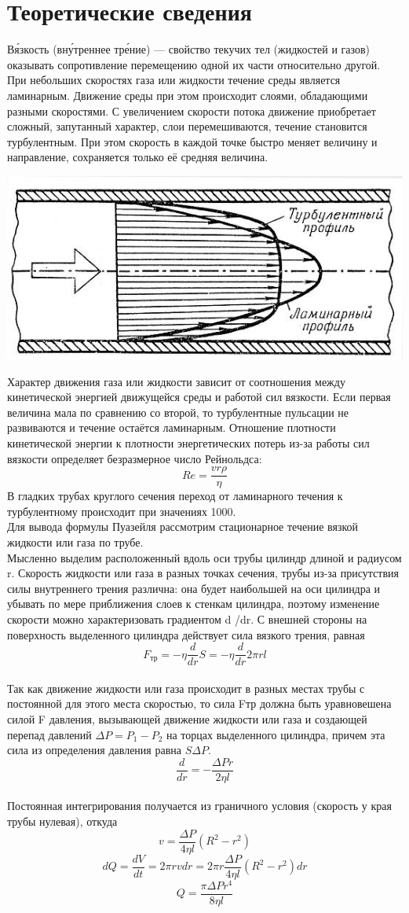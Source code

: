 \section{Теоретические сведения}
Вя́зкость (вну́треннее тре́ние) — свойство текучих тел (жидкостей и газов) оказывать сопротивление перемещению одной их части относительно другой. \\
При небольших скоростях газа или жидкости течение среды является ламинарным. Движение среды при этом происходит слоями, обладающими разными скоростями. С увеличением скорости потока движение приобретает сложный, запутанный характер, слои перемешиваются, течение становится турбулентным. При этом скорость в каждой точке быстро меняет величину и направление, сохраняется только её средняя величина.\\
\begin{center}
\includegraphics[width=0.3\linewidth]{1.jpg}\\
\end{center}
Характер движения газа или жидкости зависит от соотношения между кинетической энергией движущейся среды и работой сил вязкости. Если первая величина мала по сравнению со второй, то турбулентные пульсации не развиваются и течение остаётся ламинарным. Отношение плотности кинетической энергии к плотности энергетических потерь из-за работы сил вязкости определяет безразмерное число Рейнольдса:
\[ Re = \frac{vr\rho}{\eta} \]
В гладких трубах круглого сечения переход от ламинарного течения к турбулентному происходит при значениях 1000.\\
Для вывода формулы Пуазейля рассмотрим стационарное течение вязкой жидкости или газа по трубе.\\
Мысленно выделим расположенный вдоль оси трубы цилиндр длиной  и радиусом r. Скорость жидкости или газа в разных точках сечения, трубы из-за присутствия силы внутреннего трения различна: она будет наибольшей на оси цилиндра и убывать по мере приближения слоев к стенкам цилиндра, поэтому изменение скорости можно характеризовать градиентом d /dr. С внешней стороны на поверхность выделенного цилиндра действует сила вязкого трения, равная \[ F_{тр} = -\eta\frac{d}{dr}S = -\eta\frac{d}{dr}2\pi rl \]\\
Так как движение жидкости или газа происходит в разных местах трубы с постоянной для этого места скоростью, то сила Fтр должна быть уравновешена силой F давления, вызывающей движение жидкости или газа и создающей перепад давлений $\Delta P = P_1 - P_2$ на торцах выделенного цилиндра, причем эта сила из определения давления равна $S\Delta P$. \\
\[\frac{d}{dr} =  -\frac{\Delta Pr}{2\eta l}\]\\
Постоянная интегрирования получается из граничного условия (скорость у края трубы нулевая), откуда\\
\[v =  \frac{\Delta P}{4\eta l}(R^2-r^2) \]
\[dQ = \frac{dV}{dt} = 2\pi r vdr =2\pi r \frac{\Delta P}{4\eta l}(R^2-r^2)dr \]
\[Q =  \frac{\pi \Delta P r^4}{8\eta l} \]
